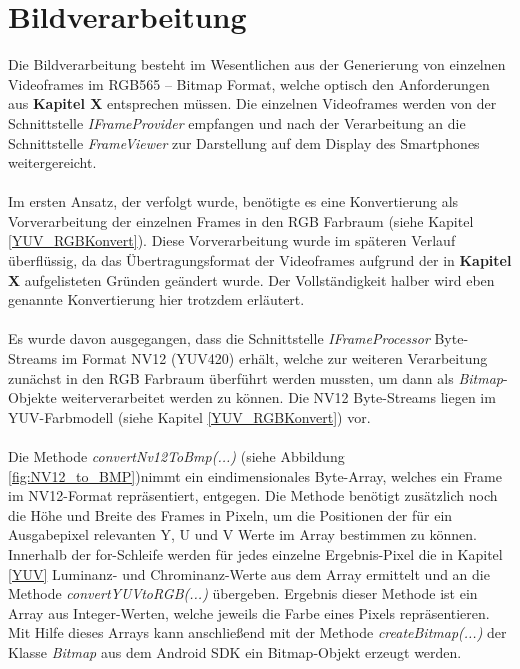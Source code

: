 \chapter{Bildverarbeitung}

Die Bildverarbeitung besteht im Wesentlichen aus der Generierung von einzelnen Videoframes im RGB565 – Bitmap Format, welche optisch den Anforderungen aus \textbf{Kapitel X} entsprechen müssen. Die einzelnen Videoframes werden von der Schnittstelle \textit{IFrameProvider} empfangen und nach der Verarbeitung an die Schnittstelle \textit{FrameViewer} zur Darstellung auf dem Display des Smartphones weitergereicht.
\\
\\
Im ersten Ansatz, der verfolgt wurde, benötigte es eine Konvertierung als Vorverarbeitung der einzelnen Frames in den RGB Farbraum (siehe Kapitel \ref{YUV_RGBKonvert}). Diese Vorverarbeitung wurde im späteren Verlauf überflüssig, da das Übertragungsformat der Videoframes aufgrund der in \textbf{Kapitel X} aufgelisteten Gründen geändert wurde. Der Vollständigkeit halber wird eben genannte Konvertierung hier trotzdem erläutert.
\\
\\
Es wurde davon ausgegangen, dass die Schnittstelle \textit{IFrameProcessor} Byte-Streams im Format NV12 (YUV420) erhält, welche zur weiteren Verarbeitung zunächst in den RGB Farbraum überführt werden mussten, um dann als \textit{Bitmap}-Objekte weiterverarbeitet werden zu können. Die NV12 Byte-Streams liegen im YUV-Farbmodell (siehe Kapitel \ref{YUV_RGBKonvert}) vor. 
\\
\\
Die Methode \textit{convertNv12ToBmp(...)} (siehe Abbildung \ref{fig:NV12_to_BMP})nimmt ein eindimensionales Byte-Array, welches ein Frame im NV12-Format repräsentiert, entgegen. Die Methode benötigt zusätzlich noch die Höhe und Breite des Frames in Pixeln, um die Positionen der für ein Ausgabepixel relevanten Y, U und V Werte im Array bestimmen zu können. Innerhalb der for-Schleife werden für jedes einzelne Ergebnis-Pixel die in Kapitel \ref{YUV} Luminanz- und Chrominanz-Werte aus dem Array ermittelt und an die Methode \textit{convertYUVtoRGB(...)} übergeben. Ergebnis dieser Methode ist ein Array aus Integer-Werten, welche jeweils die Farbe eines Pixels repräsentieren. Mit Hilfe dieses Arrays kann anschließend mit der Methode \textit{createBitmap(...)} der Klasse \textit{Bitmap} aus dem Android SDK ein Bitmap-Objekt erzeugt werden. 
\clearpage
